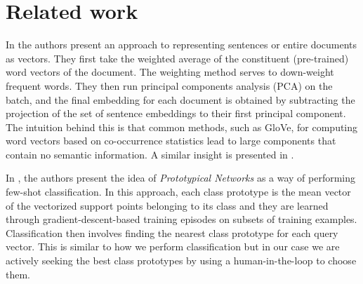 \section{Related work}
In \citep{arora2017asimple} the authors present an approach to representing sentences or entire documents as vectors. They first take the weighted average of the constituent (pre-trained) word vectors of the document. The weighting method serves to down-weight frequent words. They then run principal components analysis (PCA) on the batch, and the final embedding for each document is obtained by subtracting the projection of the set of sentence embeddings to their first principal component. The intuition behind this is that common methods, such as GloVe, for computing word vectors based on co-occurrence statistics lead to large components that contain no semantic information. A similar insight is presented in \citep{mu2017allbuttop}.

In \citep{snell2017prototypical}, the authors present the idea of \textit{Prototypical Networks} as a way of performing few-shot classification. In this approach, each class prototype is the mean vector of the vectorized support points belonging to its class and they are learned through gradient-descent-based training episodes on subsets of training examples. Classification then involves finding the nearest class prototype for each query vector. This is similar to how we perform classification but in our case we are actively seeking the best class prototypes by using a human-in-the-loop to choose them.
